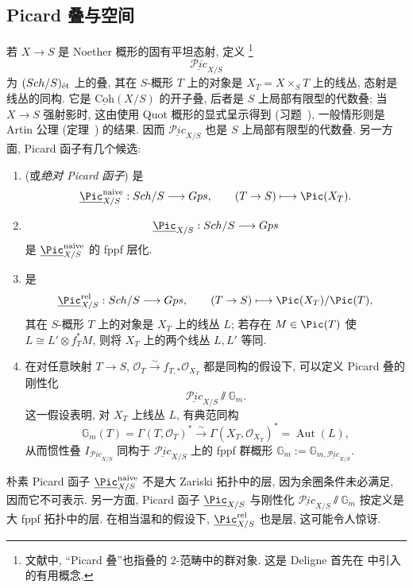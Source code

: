\subsection{Picard 叠与空间}\label{src:7.4.8-subsection}
若 $X\to S$ 是 Noether 概形的固有平坦态射, 定义 \footnote{文献中, ``Picard 叠''也指叠的 $2$-范畴中的群对象. 这是 Deligne 首先在 \cite[XVIII.1.4]{SGA4} 中引入的有用概念.}
\[
\underline{\mathcal P\!ic}_{X/S}
\]
为 $(Sch/S)_{\text{ét}}$ 上的叠, 其在 $S$-概形 $T$ 上的对象是 $X_T=X\times_S T$ 上的线丛, 态射是线丛的同构. 它是 $\underline{\mathrm{Coh}}(X/S)$ 的开子叠, 后者是 $S$ 上局部有限型的代数叠; 当 $X\to S$ 强射影时, 这由使用 Quot 概形的显式呈示得到 (习题~), 一般情形则是 Artin 公理 (定理~) 的结果. 因而 $\underline{\mathcal P\!ic}_{X/S}$ 也是 $S$ 上局部有限型的代数叠.
另一方面, Picard 函子有几个候选:
\begin{enumerate}[(1)]
\item {} (或\emph{绝对 Picard 函子}) 是
\[
\underline{\Pic}_{X/S}^{\mathrm{naive}}:\Sch/S\longrightarrow\mathsf{Gps},\qquad(T\to S)\longmapsto\Pic(X_T).
\]
\item {}
\[
\underline{\Pic}_{X/S}:\Sch/S\longrightarrow\mathsf{Gps}
\]
是 $\underline{\Pic}_{X/S}^{\mathrm{naive}}$ 的 fppf 层化.
\item {} 是
\[
\underline{\Pic}_{X/S}^{\mathrm{rel}}:\Sch/S\longrightarrow\mathsf{Gps},\qquad(T\to S)\longmapsto\Pic(X_T)/\Pic(T),
\]
其在 $S$-概形 $T$ 上的对象是 $X_T$ 上的线丛 $L$; 若存在 $M\in\Pic(T)$ 使 $L\cong L'\otimes f_T^*M$, 则将 $X_T$ 上的两个线丛 $L,L'$ 等同.
\item 在对任意映射 $T\to S$, $\mathcal O_T\xrightarrow{\sim}f_{T,*}\mathcal O_{X_T}$ 都是同构的假设下, 可以定义 Picard 叠的刚性化
\[
\underline{\mathcal P\!ic}_{X/S}\!\sslash\mathbb G_m.
\]
这一假设表明, 对 $X_T$ 上线丛 $L$, 有典范同构
\[
\mathbb G_m(T)=\Gamma(T,\mathcal O_T)^*\xrightarrow{\sim}\Gamma(X_T,\mathcal O_{X_T})^*=\operatorname{Aut}(L),
\]
从而惯性叠 $I_{\underline{\mathcal P\!ic}_{X/S}}$ 同构于 $\underline{\mathcal P\!ic}_{X/S}$ 上的 fppf 群概形 $\mathbb G_m:=\mathbb G_{m,\underline{\mathcal P\!ic}_{X/S}}$.
\end{enumerate}
朴素 Picard 函子 $\underline{\Pic}_{X/S}^{\mathrm{naive}}$ 不是大 Zariski 拓扑中的层, 因为余圈条件未必满足, 因而它不可表示. 另一方面, Picard 函子 $\underline{\Pic}_{X/S}$ 与刚性化 $\underline{\mathcal P\!ic}_{X/S}\!\sslash\mathbb G_m$ 按定义是大 fppf 拓扑中的层. 在相当温和的假设下, $\underline{\Pic}_{X/S}^{\mathrm{rel}}$ 也是层, 这可能令人惊讶.

